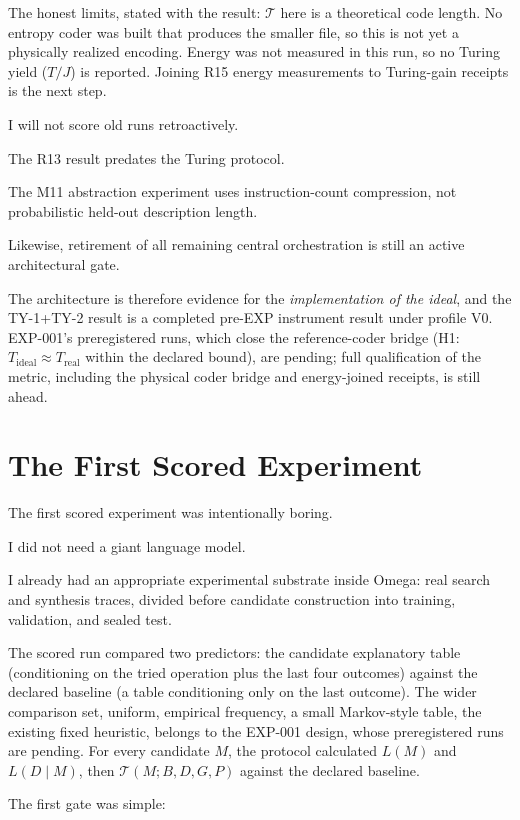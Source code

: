 \documentclass[11pt]{article}
\begin{document}
The honest limits, stated with the result: \(\mathcal{T}\) here is a theoretical code length. No entropy coder was built that produces the smaller file, so this is not yet a physically realized encoding. Energy was not measured in this run, so no Turing yield (\(T/J\)) is reported. Joining R15 energy measurements to Turing-gain receipts is the next step.

I will not score old runs retroactively.

The R13 result predates the Turing protocol.

The M11 abstraction experiment uses instruction-count compression, not probabilistic held-out description length.

Likewise, retirement of all remaining central orchestration is still an active architectural gate.

The architecture is therefore evidence for the \emph{implementation of the ideal}, and the TY-1+TY-2 result is a completed pre-EXP instrument result under profile V0. EXP-001's preregistered runs, which close the reference-coder bridge (H1: \(T_{\mathrm{ideal}} \approx T_{\mathrm{real}}\) within the declared bound), are pending; full qualification of the metric, including the physical coder bridge and energy-joined receipts, is still ahead.

\section{The First Scored Experiment}

The first scored experiment was intentionally boring.

I did not need a giant language model.

I already had an appropriate experimental substrate inside Omega: real search and synthesis traces, divided before candidate construction into training, validation, and sealed test.

The scored run compared two predictors: the candidate explanatory table (conditioning on the tried operation plus the last four outcomes) against the declared baseline (a table conditioning only on the last outcome). The wider comparison set, uniform, empirical frequency, a small Markov-style table, the existing fixed heuristic, belongs to the EXP-001 design, whose preregistered runs are pending. For every candidate \(M\), the protocol calculated \(L(M)\) and \(L(D\mid M)\), then \(\mathcal{T}(M;B,D,G,P)\) against the declared baseline.

The first gate was simple:
\end{document}

